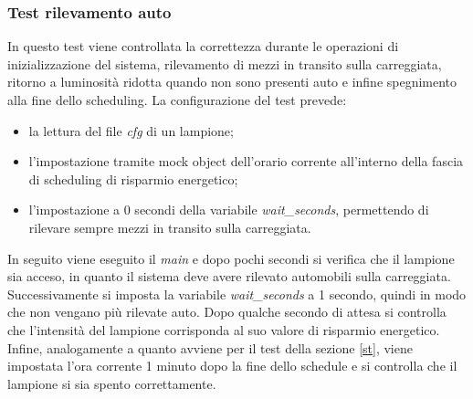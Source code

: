 \subsubsection{Test rilevamento auto}
In questo test viene controllata la correttezza durante le operazioni di inizializzazione del sistema, rilevamento di mezzi in transito sulla carreggiata, ritorno a luminosità ridotta quando non sono presenti auto e infine spegnimento alla fine dello scheduling.
La configurazione del test prevede:
\begin{itemize}
	\item la lettura del file \textit{cfg} di un lampione;
	\item l'impostazione tramite mock object dell'orario corrente all'interno della fascia di scheduling di risparmio energetico;
	\item l'impostazione a 0 secondi della variabile \textit{wait\_seconds}, permettendo di rilevare sempre mezzi in transito sulla carreggiata.
\end{itemize}
In seguito viene eseguito il \textit{main} e dopo pochi secondi si verifica che il lampione sia acceso, in quanto il sistema deve avere rilevato automobili sulla carreggiata.
Successivamente si imposta la variabile \textit{wait\_seconds} a 1 secondo, quindi in modo che non vengano più rilevate auto.
Dopo qualche secondo di attesa si controlla che l'intensità del lampione corrisponda al suo valore di risparmio energetico.
Infine, analogamente a quanto avviene per il test della sezione \ref{st}, viene impostata l'ora corrente 1 minuto dopo la fine dello schedule e si controlla che il lampione si sia spento correttamente.

